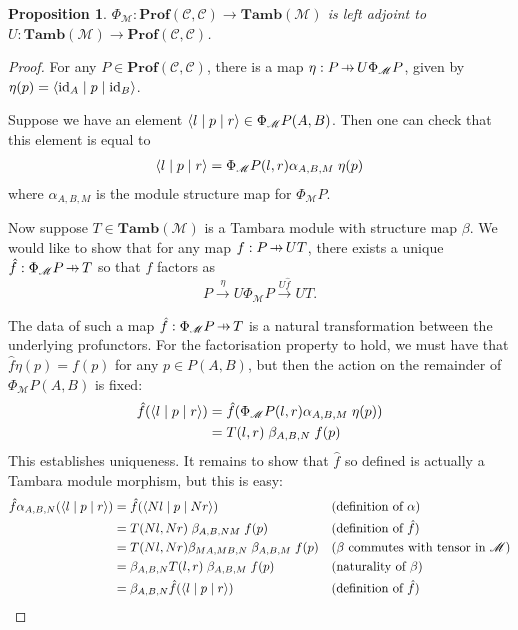 \documentclass[11pt,a4paper]{article}
\theoremstyle{plain}
\newtheorem{proposition}[theorem]{Proposition}
\theoremstyle{definition}
\newcommand{\C}{\mathscr{C}}
\newcommand{\M}{\mathscr{M}}
\newcommand{\Pastro}{\Phi}
\newcommand{\Prof}{\mathbf{Prof}}
\newcommand{\Tamb}{\mathbf{Tamb}}
\newcommand{\id}{\mathrm{id}}
\newcommand{\repthree}[3]{{\ensuremath \langle #1 \mid #2 \mid #3 \rangle}}
\newcommand{\hto}{\ensuremath{\,\mathaccent\shortmid\rightarrow\,}}
\begin{document}
\begin{proposition}
  $\Pastro_\M : \Prof(\C, \C) \to \Tamb(\M)$ is left adjoint to $U : \Tamb(\M) \to \Prof(\C, \C)$.
\end{proposition}
\begin{proof}
  For any $P \in \Prof(\C, \C)$, there is a map $\eta : P \hto U \Phi_\M P$, given by $\eta(p) = \repthree{\id_A}{p}{\id_B }$.

  Suppose we have an element $\repthree{l}{p}{r} \in \Pastro_\M P(A,B)$. Then one can check that this element is equal to
  \begin{align*}
    \repthree{l}{p}{r } = \Pastro_\M P(l, r) \alpha_{A, B, M} \; \eta(p)
  \end{align*}
  where $\alpha_{A, B, M}$ is the module structure map for $\Pastro_\M P$.

  Now suppose $T \in \Tamb(\M)$ is a Tambara module with structure map $\beta$. We would like to show that for any map $f : P \hto UT$, there exists a unique $\hat f : \Phi_\M P \hto T$ so that $f$ factors as \[P \xrightarrow{\eta} U \Phi_\M P \xrightarrow{U\hat f} UT. \]

  The data of such a map $\hat f : \Phi_\M P \hto T$ is a natural transformation between the underlying profunctors. For the factorisation property to hold, we must have that $\hat{f}\eta(p) = f(p)$ for any $p \in P(A,B)$, but then the action on the remainder of $\Phi_\M P(A, B)$ is fixed:
  \begin{align*}
    \hat{f}(\repthree{l}{p}{r}) &= \hat{f}(\Pastro_\M P(l, r) \alpha_{A, B, M} \; \eta(p)) \\
                                     &=T(l, r) \; \beta_{A, B, N} \; f(p)
  \end{align*}
  This establishes uniqueness. It remains to show that $\hat{f}$ so defined is actually a Tambara module morphism, but this is easy:
  \begin{align*}
    \hat{f}\alpha_{A,B,N}(\repthree{l}{p}{r })
    &= \hat{f}(\repthree{Nl}{p}{Nr }) && \text{(definition of $\alpha$)}\\
    &= T(Nl, Nr) \; \beta_{A, B, NM} \; f(p) && \text{(definition of $\hat{f}$)}\\
    &= T(Nl, Nr) \beta_{MA,MB,N} \; \beta_{A, B, M} \; f(p) && \text{($\beta$ commutes with tensor in $\M$)} \\
    &= \beta_{A,B,N} T(l, r) \; \beta_{A, B, M} \; f(p) && \text{(naturality of $\beta$)} \\
    &= \beta_{A,B,N} \hat{f} (\repthree{l}{p}{r}) && \text{(definition of $\hat{f}$)}
  \end{align*}
\end{proof}
\end{document}
